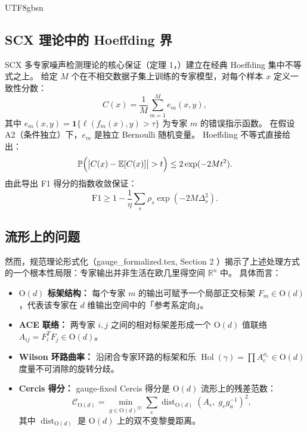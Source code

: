 \documentclass[12pt,a4paper]{article}
\theoremstyle{plain}
\theoremstyle{definition}
\theoremstyle{remark}
\newcommand{\R}{\mathbb{R}}
\newcommand{\E}{\mathbb{E}}
\newcommand{\Pbb}{\mathbb{P}}
\newcommand{\Od}{\mathrm{O}(d)}
\newcommand{\cercis}{\mathcal{C}}
\DeclareMathOperator{\Hol}{Hol}
\DeclareMathOperator{\dist}{dist}
\begin{document}
\begin{CJK}{UTF8}{gbsn}
\subsection{SCX 理论中的 Hoeffding 界}

SCX 多专家噪声检测理论的核心保证（定理 1，\cite{scx_theory}）建立在经典 Hoeffding 集中不等式之上。
给定 $M$ 个在不相交数据子集上训练的专家模型，对每个样本 $x$ 定义一致性分数：
\begin{equation}\label{eq:consistency}
    C(x) = \frac{1}{M}\sum_{m=1}^{M} e_m(x, y),
\end{equation}
其中 $e_m(x,y) = \mathbf{1}\{\ell(f_m(x), y) > \tau\}$ 为专家 $m$ 的错误指示函数。
在假设 A2（条件独立）下，$e_m$ 是独立 Bernoulli 随机变量。
Hoeffding 不等式直接给出：
\begin{equation}\label{eq:hoeffding_base}
    \Pbb\Bigl(\bigl|C(x) - \E[C(x)]\bigr| > t\Bigr) \leq 2\exp(-2M t^2).
\end{equation}
由此导出 F1 得分的指数收敛保证：
\begin{equation}\label{eq:f1_bound}
    \mathrm{F1} \geq 1 - \frac{1}{\eta}\sum_{s} \rho_s \exp(-2M\Delta_s^2).
\end{equation}

\subsection{流形上的问题}

然而，规范理论形式化（gauge\_formalized.tex, Section 2 \cite{scx_gauge}）揭示了上述处理方式的一个根本性局限：专家输出并非生活在欧几里得空间 $\R^n$ 中。
具体而言：

\begin{itemize}
    \item \textbf{$\Od$ 标架结构：} 每个专家 $m$ 的输出可赋予一个局部正交标架 $F_m \in \Od$，代表该专家在 $d$ 维输出空间中的「参考系定向」。
    \item \textbf{ACE 联络：} 两专家 $i,j$ 之间的相对标架差形成一个 $\Od$ 值联络 $A_{ij} = F_i^T F_j \in \Od$。
    \item \textbf{Wilson 环路曲率：} 沿闭合专家环路的标架和乐 $\Hol(\gamma) = \prod A_e^{\sigma_e} \in \Od$ 度量不可消除的旋转分歧。
    \item \textbf{Cercis 得分：} gauge-fixed Cercis 得分是 $\Od$ 流形上的残差范数：
    \begin{equation}\label{eq:cercis_od}
        \cercis_{\Od} = \min_{g \in \Od^{|V|}} \sum_{e} \dist_{\Od}(A_e,\; g_v g_u^{-1})^2,
    \end{equation}
    其中 $\dist_{\Od}$ 是 $\Od$ 上的双不变黎曼距离。
\end{itemize}


\end{CJK}
\end{document}
